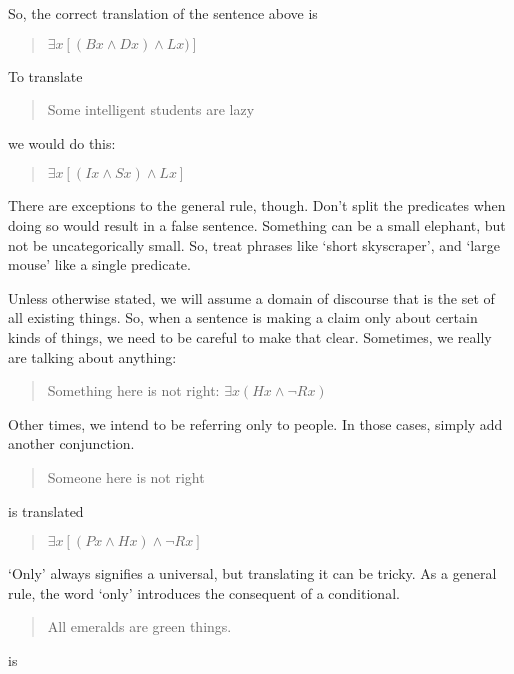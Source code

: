\documentclass[../logic-text.tex]{subfiles}
\begin{document}
So, the correct translation of the sentence above is

\begin{quote}
  \(\exists x[(Bx \land Dx) \land Lx)]\)
\end{quote}

To translate

\begin{quote}
Some intelligent students are lazy  
\end{quote}

we would do this:

\begin{quote}
 \(\exists x [(Ix \land Sx) \land Lx]\)
\end{quote}

There are exceptions to the general rule, though. Don't split the predicates when doing so would result in a false sentence. Something can be a small elephant, but not be uncategorically small. So, treat phrases like \enquote*{short skyscraper}, and \enquote*{large mouse} like a single predicate.


Unless otherwise stated, we will assume a domain of discourse that is the set of all existing things. So, when a sentence is making a claim only about certain kinds of things, we need to be careful to make that clear. Sometimes, we really are talking about anything:

\begin{quote}
Something here is not right: \(\exists x (Hx \land \lnot Rx)\)  
\end{quote}

Other times, we intend to be referring only to people. In those cases, simply add another conjunction.


\begin{quote}
Someone here is not right  
\end{quote}

\noindent is translated

\begin{quote}
\(\exists x[(Px \land Hx) \land \lnot Rx]\)  
\end{quote}


\enquote*{Only} always signifies a universal, but translating it can be tricky. As a general rule, the word \enquote*{only} introduces the consequent of a conditional. 

\begin{quote}
  All emeralds are green things.
\end{quote}

\noindent is
\end{document}
